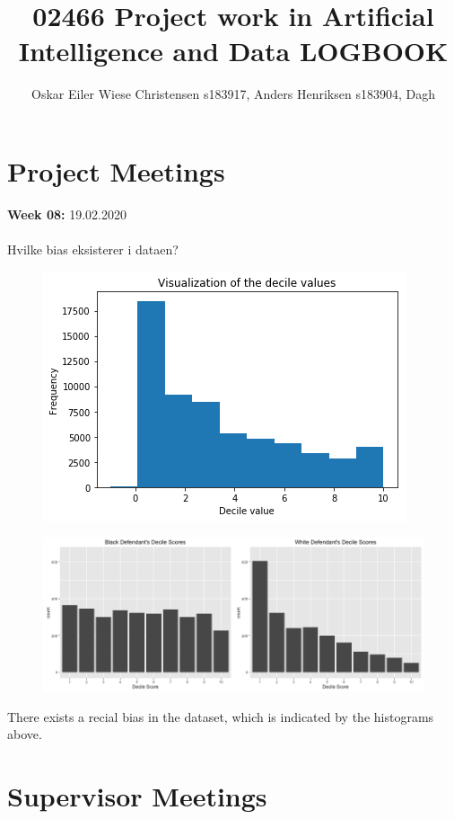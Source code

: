 \documentclass[11pt, fleqn]{article}
\title{02466 Project work in Artificial Intelligence and Data LOGBOOK}
\author{Oskar Eiler Wiese Christensen s183917, Anders Henriksen s183904, Dagh}
\begin{document}
	\maketitle
		
\section*{Project Meetings}
	
	
	\textbf{Week 08:}  19.02.2020 \\\\
	\noindent
	Hvilke bias eksisterer i dataen? \\ 
	\begin{figure}[H]
		\centering
		\includegraphics[width=0.3\linewidth]{billeder/decil.png}
	\end{figure}

	\begin{figure}[H]
		\centering
		\includegraphics[width=0.7\linewidth]{billeder/black_white}
	\end{figure}
	\noindent
	There exists a recial bias in the dataset, which is indicated by the histograms above. 
	
\section*{Supervisor Meetings}
	
\end{document}

